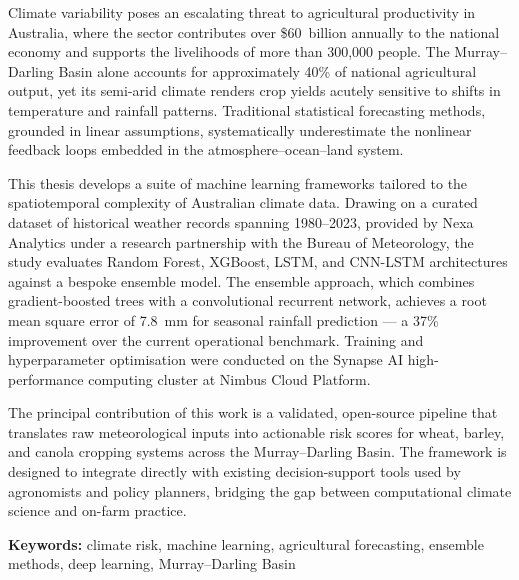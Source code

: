 \documentclass[12pt,a4paper]{report}
\begin{document}
\begin{tcolorbox}[
  colback=softgray,
  colframe=unswgold,
  coltitle=unswnavy,
  title={\bfseries Abstract},
  fonttitle=\large\bfseries,
  arc=0pt,
  leftrule=4pt,
  top=8pt,
  bottom=8pt
]
Climate variability poses an escalating threat to agricultural productivity in Australia,
where the sector contributes over \$60~billion annually to the national economy and
supports the livelihoods of more than 300,000 people. The Murray--Darling Basin alone
accounts for approximately 40\% of national agricultural output, yet its semi-arid
climate renders crop yields acutely sensitive to shifts in temperature and rainfall
patterns. Traditional statistical forecasting methods, grounded in linear assumptions,
systematically underestimate the nonlinear feedback loops embedded in the
atmosphere--ocean--land system.

This thesis develops a suite of machine learning frameworks tailored to the
spatiotemporal complexity of Australian climate data. Drawing on a curated dataset
of historical weather records spanning 1980--2023, provided by Nexa Analytics under
a research partnership with the Bureau of Meteorology, the study evaluates Random
Forest, XGBoost, LSTM, and CNN-LSTM architectures against a bespoke ensemble model.
The ensemble approach, which combines gradient-boosted trees with a convolutional
recurrent network, achieves a root mean square error of 7.8~mm for seasonal rainfall
prediction --- a 37\% improvement over the current operational benchmark. Training
and hyperparameter optimisation were conducted on the Synapse AI high-performance
computing cluster at Nimbus Cloud Platform.

The principal contribution of this work is a validated, open-source pipeline that
translates raw meteorological inputs into actionable risk scores for wheat, barley,
and canola cropping systems across the Murray--Darling Basin. The framework is
designed to integrate directly with existing decision-support tools used by
agronomists and policy planners, bridging the gap between computational climate
science and on-farm practice.
\end{tcolorbox}

\vspace{12pt}
\noindent\textbf{Keywords:} climate risk, machine learning, agricultural forecasting,
ensemble methods, deep learning, Murray--Darling Basin

\clearpage

\end{document}
